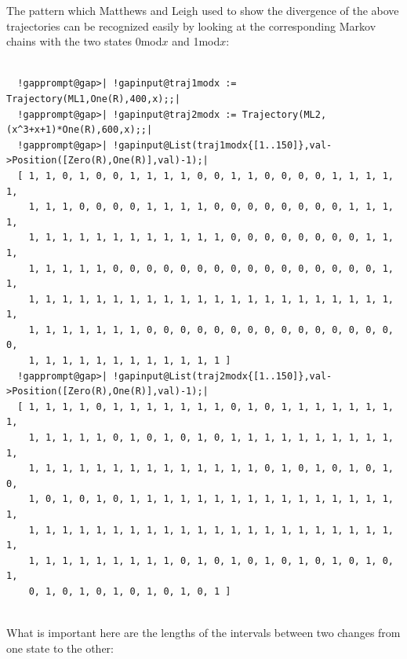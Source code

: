 \documentclass[a4paper,11pt]{report}
\begin{document}
{{\begin{Verbatim}[commandchars=!@A,fontsize=\small,frame=single,label=Example]
\end{Verbatim}
 The pattern which Matthews and Leigh used to show the divergence of the above
trajectories can be recognized easily by looking at the corresponding Markov
chains with the two states 0{\nobreakspace}mod{\nobreakspace}$x$ and 1{\nobreakspace}mod{\nobreakspace}$x$: 
\begin{Verbatim}[commandchars=!@|,fontsize=\small,frame=single,label=Example]
  
  !gapprompt@gap>| !gapinput@traj1modx := Trajectory(ML1,One(R),400,x);;|
  !gapprompt@gap>| !gapinput@traj2modx := Trajectory(ML2,(x^3+x+1)*One(R),600,x);;|
  !gapprompt@gap>| !gapinput@List(traj1modx{[1..150]},val->Position([Zero(R),One(R)],val)-1);|
  [ 1, 1, 0, 1, 0, 0, 1, 1, 1, 1, 0, 0, 1, 1, 0, 0, 0, 0, 1, 1, 1, 1, 1, 
    1, 1, 1, 0, 0, 0, 0, 1, 1, 1, 1, 0, 0, 0, 0, 0, 0, 0, 0, 1, 1, 1, 1, 
    1, 1, 1, 1, 1, 1, 1, 1, 1, 1, 1, 1, 0, 0, 0, 0, 0, 0, 0, 0, 1, 1, 1, 
    1, 1, 1, 1, 1, 0, 0, 0, 0, 0, 0, 0, 0, 0, 0, 0, 0, 0, 0, 0, 0, 1, 1, 
    1, 1, 1, 1, 1, 1, 1, 1, 1, 1, 1, 1, 1, 1, 1, 1, 1, 1, 1, 1, 1, 1, 1, 
    1, 1, 1, 1, 1, 1, 1, 0, 0, 0, 0, 0, 0, 0, 0, 0, 0, 0, 0, 0, 0, 0, 0, 
    1, 1, 1, 1, 1, 1, 1, 1, 1, 1, 1, 1 ]
  !gapprompt@gap>| !gapinput@List(traj2modx{[1..150]},val->Position([Zero(R),One(R)],val)-1);|
  [ 1, 1, 1, 1, 0, 1, 1, 1, 1, 1, 1, 1, 0, 1, 0, 1, 1, 1, 1, 1, 1, 1, 1, 
    1, 1, 1, 1, 1, 0, 1, 0, 1, 0, 1, 0, 1, 1, 1, 1, 1, 1, 1, 1, 1, 1, 1, 
    1, 1, 1, 1, 1, 1, 1, 1, 1, 1, 1, 1, 1, 1, 0, 1, 0, 1, 0, 1, 0, 1, 0, 
    1, 0, 1, 0, 1, 0, 1, 1, 1, 1, 1, 1, 1, 1, 1, 1, 1, 1, 1, 1, 1, 1, 1, 
    1, 1, 1, 1, 1, 1, 1, 1, 1, 1, 1, 1, 1, 1, 1, 1, 1, 1, 1, 1, 1, 1, 1, 
    1, 1, 1, 1, 1, 1, 1, 1, 1, 0, 1, 0, 1, 0, 1, 0, 1, 0, 1, 0, 1, 0, 1, 
    0, 1, 0, 1, 0, 1, 0, 1, 0, 1, 0, 1 ]
  
\end{Verbatim}
 What is important here are the lengths of the intervals between two changes
from one state to the other: 
\begin{Verbatim}[commandchars=!@|,fontsize=\small,frame=single,label=Example]
  

\end{Verbatim}}}
\end{document}
